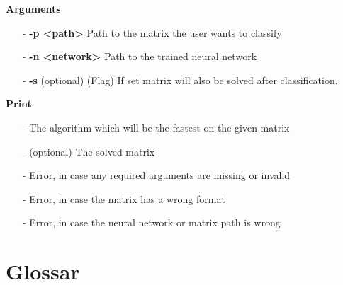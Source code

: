 \documentclass[parskip=full]{scrartcl}
\begin{document}
\begin{itemize}
\textbf{Arguments}
	\begin{itemize}
	\item[-]\textbf{-p <path>} Path to the matrix the user wants to classify
	\item[-]\textbf{-n <network>} Path to the trained neural network
	\item[-]\textbf{-s} (optional) (Flag) If set matrix will also be solved after classification.
	\end{itemize}

\textbf{Print}
	\begin{itemize}
	\item[-]The algorithm which will be the fastest on the given matrix
	\item[-](optional) The solved matrix
	\item[-]Error, in case any required arguments are missing or invalid
	\item[-]Error, in case the matrix has a wrong format
	\item[-]Error, in case the neural network or matrix path is wrong
	\end{itemize}
\end{itemize}
\clearpage

\section{Glossar}

%
\printnoidxglossaries
\end{document}
